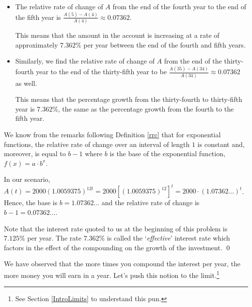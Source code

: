 \documentclass{ximera}
\begin{document}
\begin{example}
\begin{enumerate}
\begin{itemize}

\item  The relative rate of change of $A$ from the end of the fourth year to the end of the fifth year is $\frac{A(5)-A(4)}{A(4)} \approx 0.07362$. 

\smallskip

This means that the amount in the account is increasing at a rate of approximately $7.362 \%$ per year between the end of the fourth and fifth years.

\item Similarly, we find the relative rate of change of $A$ from the end  of the thirty-fourth year to the end of the thirty-fifth year to be $\frac{A(35)-A(34)}{A(34)} \approx  0.07362$ as well.  

This means that the percentage growth from the thirty-fourth to thirty-fifth year is $7.362 \%$, the same as the percentage growth from the fourth to the fifth year.

\end{itemize}

We know from the remarks following Definition \ref{rrc} that for exponential functions, the relative rate of change over an interval of length $1$ is constant and, moreover, is equal to $b-1$ where $b$ is the base of the exponential function, $f(x) = a \cdot b^{x}$.  

\smallskip

In our scenario,  $A(t) = 2000 (1.0059375)^{12t} = 2000  \left[(1.0059375)^{12}\right]^{t} = 2000 \cdot (1.07362 \ldots)^t$.  Hence, the base is $b = 1.07362 \ldots$ and the relative rate of change is $b-1 = 0.07362 \ldots$.    

\smallskip

Note that the interest rate quoted to us at the beginning of this problem is $7.125 \%$ per year.  The rate $7.362 \%$ is called the `\textit{effective}' interest rate which factors in the effect of the compounding on the growth of the investment. \qed

\end{enumerate}

\end{example}

We have observed that the more times you compound the interest per year, the more money you will earn in a year.  Let's push this notion to the limit.\footnote{See Section \ref{IntroLimits} to understand this pun.}  

\smallskip
\end{document}
